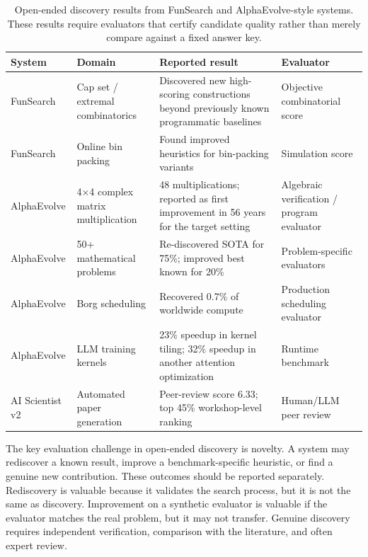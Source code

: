 \begin{table}[t]
\centering
\TableTight
\caption{Open-ended discovery results from FunSearch and AlphaEvolve-style systems. These results require evaluators that certify candidate quality rather than merely compare against a fixed answer key.}
\label{tab:open-ended-results}
\begin{tabularx}{\textwidth}{@{}L{0.16\textwidth}L{0.29\textwidth}L{0.35\textwidth}Y@{}}
\toprule
\textbf{System} & \textbf{Domain} & \textbf{Reported result} & \textbf{Evaluator} \\
\midrule
FunSearch & Cap set / extremal combinatorics & Discovered new high-scoring constructions beyond previously known programmatic baselines & Objective combinatorial score \\
FunSearch & Online bin packing & Found improved heuristics for bin-packing variants & Simulation score \\
AlphaEvolve & 4$\times$4 complex matrix multiplication & 48 multiplications; reported as first improvement in 56 years for the target setting & Algebraic verification / program evaluator \\
AlphaEvolve & 50+ mathematical problems & Re-discovered SOTA for 75\%; improved best known for 20\% & Problem-specific evaluators \\
AlphaEvolve & Borg scheduling & Recovered 0.7\% of worldwide compute & Production scheduling evaluator \\
AlphaEvolve & LLM training kernels & 23\% speedup in kernel tiling; 32\% speedup in another attention optimization & Runtime benchmark \\
AI Scientist v2 & Automated paper generation & Peer-review score 6.33; top 45\% workshop-level ranking & Human/LLM peer review \\
\bottomrule
\end{tabularx}
\end{table}

The key evaluation challenge in open-ended discovery is novelty. A system may rediscover a known result, improve a benchmark-specific heuristic, or find a genuine new contribution. These outcomes should be reported separately. Rediscovery is valuable because it validates the search process, but it is not the same as discovery. Improvement on a synthetic evaluator is valuable if the evaluator matches the real problem, but it may not transfer. Genuine discovery requires independent verification, comparison with the literature, and often expert review.

